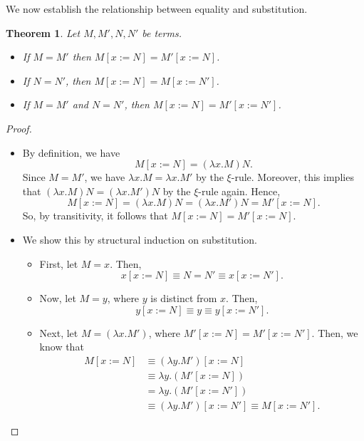 \documentclass[a4paper, openany]{memoir}
\newtheorem{theorem}[proposition]{Theorem}
\theoremstyle{definition}
\begin{document}
    We now establish the relationship between equality and substitution.
    \begin{theorem}
        Let $M, M', N, N'$ be terms.
        \begin{itemize}
            \item If $M = M'$ then $M[x := N] = M'[x := N]$.
            \item If $N = N'$, then $M[x := N] = M[x := N']$.
            \item If $M = M'$ and $N = N'$, then $M[x := N] = M'[x := N']$.
        \end{itemize}
    \end{theorem}
    \begin{proof}
        \hspace*{0pt}
        \begin{itemize}
            \item By definition, we have
            \[M[x := N] = (\lambda x.M)N.\]
            Since $M = M'$, we have $\lambda x.M = \lambda x.M'$ by the $\xi$-rule. Moreover, this implies that $(\lambda x.M)N = (\lambda x.M')N$ by the $\xi$-rule again. Hence,
            \[M[x := N] = (\lambda x.M)N = (\lambda x.M')N = M'[x := N].\]
            So, by transitivity, it follows that $M[x := N] = M'[x := N]$.

            \item We show this by structural induction on substitution.
            \begin{itemize}
                \item First, let $M = x$. Then,
                \[x[x := N] \equiv N = N' \equiv x[x := N'].\]

                \item Now, let $M = y$, where $y$ is distinct from $x$. Then,
                \[y[x := N] \equiv y \equiv y[x := N'].\]

                \item Next, let $M = (\lambda x.M')$, where $M'[x := N] = M'[x := N']$. Then, we know that
                \begin{align*}
                    M[x := N] &\equiv (\lambda y.M')[x := N] \\
                    &\equiv \lambda y.(M'[x := N]) \\
                    &= \lambda y.(M'[x := N']) \\
                    &\equiv (\lambda y.M')[x := N'] \equiv M[x := N'].
                \end{align*}


\end{itemize}
\end{itemize}
\end{proof}
\end{document}
